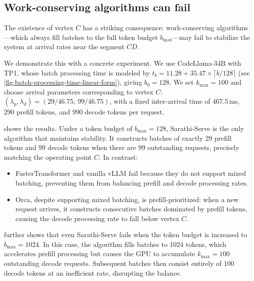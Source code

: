 \documentclass[11pt]{article}
\theoremstyle{plain}
\theoremstyle{definition}
\theoremstyle{remark}
\begin{document}
\subsection{Work-conserving algorithms can fail}

The existence of vertex $C$ has a striking consequence: work-conserving algorithms---which always fill batches to the full token budget $b_{\max}$---may fail to stabilize the system at arrival rates near the segment $\overline{CD}$.

We demonstrate this with a concrete experiment. We use CodeLlama-34B with TP1, whose batch processing time is modeled by $t_b = 11.28 + 35.47 \times \lceil b/128 \rceil$ (see \cref{fig:batch-processing-time-linear-form}), giving $b_0 = 128$. We set $k_{\max} = 100$ and choose arrival parameters corresponding to vertex $C$: $(\lambda_p, \lambda_d) = (29/46.75,\, 99/46.75)$, with a fixed inter-arrival time of 467.5\,ms, 290 prefill tokens, and 990 decode tokens per request.

 shows the results. Under a token budget of $b_{\max} = 128$, Sarathi-Serve is the only algorithm that maintains stability. It constructs batches of exactly 29 prefill tokens and 99 decode tokens when there are 99 outstanding requests, precisely matching the operating point $C$. In contrast:
\begin{itemize}
    \item FasterTransformer and vanilla vLLM fail because they do not support mixed batching, preventing them from balancing prefill and decode processing rates.
    \item Orca, despite supporting mixed batching, is prefill-prioritized: when a new request arrives, it constructs consecutive batches dominated by prefill tokens, causing the decode processing rate to fall below vertex $C$.
\end{itemize}
 further shows that even Sarathi-Serve fails when the token budget is increased to $b_{\max} = 1024$. In this case, the algorithm fills batches to 1024 tokens, which accelerates prefill processing but causes the GPU to accumulate $k_{\max} = 100$ outstanding decode requests. Subsequent batches then consist entirely of 100 decode tokens at an inefficient rate, disrupting the balance.
\end{document}
